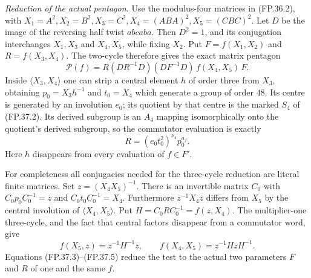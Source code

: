 \emph{Reduction of the actual pentagon.}
Use the modulus-four matrices in (FP.36.2), with
$X_1=A^2,X_2=B^2,X_3=C^2,X_4=(ABA)^2,X_5=(CBC)^2$.
Let $D$ be the image of the reversing half twist
$abcaba$. Then $D^2=1$, and its conjugation interchanges
$X_1,X_3$ and $X_4,X_5$, while fixing $X_2$.
Put $F=f(X_1,X_2)$ and $R=f(X_3,X_4)$. The two-cycle
therefore gives the exact matrix pentagon
\[
 \mathcal P(f)=
 R(DR^{-1}D)(DF^{-1}D)\,f(X_4,X_5)\,F.
 \tag{FP.37.3}
\]
Inside $\langle X_3,X_4\rangle$ one can strip a central
element $h$ of order three from $X_3$, obtaining
$p_0=X_3h^{-1}$ and $t_0=X_4$ which generate a group of
order $48$. Its centre is generated by an involution $e_0$;
its quotient by that centre is the marked $S_4$ of
(FP.37.2). Its derived subgroup is an $A_4$ mapping
isomorphically onto the quotient's derived subgroup, so the
commutator evaluation is exactly
\[
 R=(e_0t_0^2)^{\nu_4}p_0^{a_f}.
 \tag{FP.37.4}
\]
Here $h$ disappears from every evaluation of $f\in F'$.

For completeness all conjugacies needed for the three-cycle
reduction are literal finite matrices. Set
$z=(X_4X_5)^{-1}$. There is an invertible matrix $C_0$ with
$C_0p_0C_0^{-1}=z$ and $C_0t_0C_0^{-1}=X_4$.
Furthermore $z^{-1}X_4z$ differs from $X_5$ by the central
involution of $\langle X_4,X_5\rangle$. Put
$H=C_0RC_0^{-1}=f(z,X_4)$. The multiplier-one three-cycle,
and the fact that central factors disappear from a commutator
word, give
\[
 f(X_5,z)=z^{-1}H^{-1}z,
 \qquad f(X_4,X_5)=z^{-1}HzH^{-1}.
 \tag{FP.37.5}
\]
Equations (FP.37.3)--(FP.37.5) reduce the test to the actual
two parameters $F$ and $R$ of one and the same $f$.

